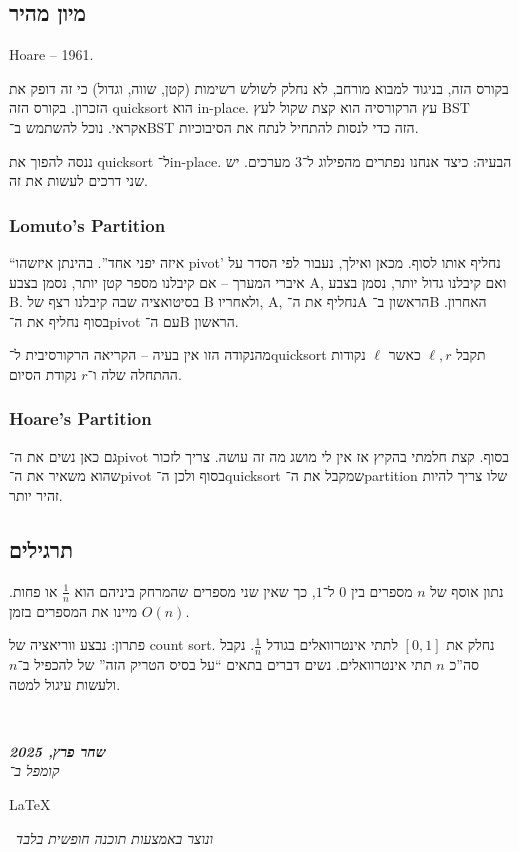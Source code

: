 \documentclass[]{article}
\newcommand\en[1] {\begin{otherlanguage}{english}#1\end{otherlanguage}}
\newcommand\ndoc  {\dotfill \\ \vfil {\begin{center}
            {\textbf{\textit{שחר פרץ, 2025}} \\
                \scriptsize \textit{קומפל ב־}\en{\LaTeX}\,\textit{ ונוצר באמצעות תוכנה חופשית בלבד}}
    \end{center}} \vfil	}
\newcommand\ml    {\ell}
\theoremstyle{definition}
\begin{document}
    
    \subsection*{מיון מהיר}
    Hoare -- 1961. 
    
    בקורס הזה, בניגוד למבוא מורחב, לא נחלק לשולש רשימות (קטן, שווה, וגדול) כי זה דופק את הזכרון. בקורס הזה quicksort הוא in-place. עץ הרקורסיה הוא קצת שקול לעץ BST אקראי. נוכל להשתמש ב־BST הזה כדי לנסות להתחיל לנתח את הסיבוכיות. 
    
    ננסה להפוך את quicksort ל־in-place. הבעיה: כיצד אנחנו נפתרים מהפילוג ל־3 מערכים. יש שני דרכים לעשות את זה. 
    \en{\subsubsection*{Lomuto's Partition}}
    ``איזה יפני אחד''. בהינתן איזשהו pivot' נחליף אותו לסוף. מכאן ואילך, נעבור לפי הסדר על איברי המערך – אם קיבלנו מספר קטן יותר, נסמן בצבע A, ואם קיבלנו גדול יותר, נסמן בצבע B. בסיטואציה שבה קיבלנו רצף של B ולאחריו, A, נחליף את ה־A הראשון ב־B האחרון. בסוף נחליף את ה־pivot עם ה־B הראשון. 
    
    מהנקודה הזו אין בעיה – הקריאה הרקורסיבית ל־quicksort תקבל $\ml, r$ כאשר $\ml$ נקודות ההתחלה שלה ו־$r$ נקודת הסיום. 
    
    \en{\subsubsection*{Hoare's Partition}}
    גם כאן נשים את ה־pivot בסוף. קצת חלמתי בהקיץ אז אין לי מושג מה זה עושה. צריך לזכור שהוא משאיר את ה־pivot בסוף ולכן ה־quicksort שמקבל את ה־partition שלו צריך להיות זהיר יותר. 
    
    \subsection*{תרגילים}
    נתון אוסף של $n$ מספרים בין $0$ ל־$1$, כך שאין שני מספרים שהמרחק ביניהם הוא $ \frac{1}{n}$ או פחות. מיינו את המספרים בזמן $O(n)$. 
    
    פתרון: נבצע ווריאציה של count sort. נחלק את $[0, 1]$ לתתי אינטרוואלים בגודל $\frac{1}{n}$. נקבל סה''כ $n$ תתי אינטרוואלים. נשים דברים בתאים ``על בסיס הטריק הזה'' של להכפיל ב־$n$ ולעשות עיגול למטה. 
    
    
    
    
    \ndoc
\end{document}
